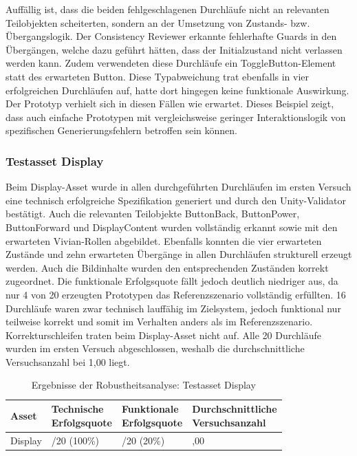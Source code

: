 Auffällig ist, dass die beiden fehlgeschlagenen Durchläufe nicht an relevanten Teilobjekten scheiterten, sondern an der Umsetzung von Zustands- bzw. Übergangslogik. Der Consistency Reviewer erkannte fehlerhafte Guards in den Übergängen, welche dazu geführt hätten, dass der Initialzustand nicht verlassen werden kann.
Zudem verwendeten diese Durchläufe ein ToggleButton-Element statt des erwarteten Button. Diese Typabweichung trat ebenfalls in vier erfolgreichen Durchläufen auf, hatte dort hingegen keine funktionale Auswirkung. Der Prototyp verhielt sich in diesen Fällen wie erwartet. Dieses Beispiel zeigt, dass auch einfache Prototypen mit vergleichsweise geringer Interaktionslogik von spezifischen Generierungsfehlern betroffen sein können.

\subsubsection*{Testasset Display}

Beim Display-Asset wurde in allen durchgeführten Durchläufen im ersten Versuch eine technisch erfolgreiche Spezifikation generiert und durch den Unity-Validator bestätigt. Auch die relevanten Teilobjekte ButtonBack, ButtonPower, ButtonForward und DisplayContent wurden vollständig erkannt sowie mit den erwarteten Vivian-Rollen abgebildet. Ebenfalls konnten die vier erwarteten Zustände und zehn erwarteten Übergänge in allen Durchläufen strukturell erzeugt werden. Auch die Bildinhalte wurden den entsprechenden Zuständen korrekt zugeordnet. Die funktionale Erfolgsquote fällt jedoch deutlich niedriger aus, da nur 4 von 20 erzeugten Prototypen das Referenzszenario vollständig erfüllten. 16 Durchläufe waren zwar technisch lauffähig im Zielsystem, jedoch funktional nur teilweise korrekt und somit im Verhalten anders als im Referenzszenario. Korrekturschleifen traten beim Display-Asset nicht auf. Alle 20 Durchläufe wurden im ersten Versuch abgeschlossen, weshalb die durchschnittliche Versuchsanzahl bei 1,00 liegt.

\begin{table}[htbp]
  \centering
  \begin{tabularx}{\linewidth}{X>{\raggedright\arraybackslash}X>{\raggedright\arraybackslash}X>{\raggedright\arraybackslash}X}
    \toprule
    Asset   & \shortstack[l]{Technische\\Erfolgsquote} & \shortstack[l]{Funktionale\\Erfolgsquote} & \shortstack[l]{Durchschnittliche\\Versuchsanzahl} \\
    \midrule
    Display & 20/20 (100\%)                            & 4/20 (20\%)                               & 1,00                                              \\
    \bottomrule
  \end{tabularx}
  \caption{Ergebnisse der Robustheitsanalyse: Testasset Display}\label{tab:robustheitsanalyse_ergebnisse_display}
\end{table}

